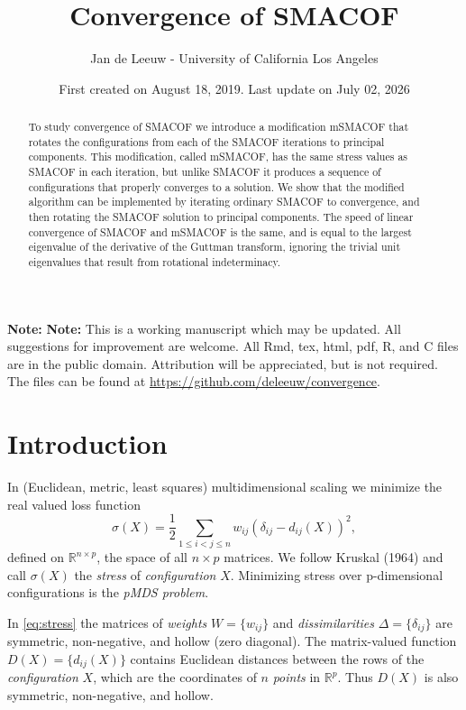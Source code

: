 \documentclass[
  12pt,
]{article}
\title{Convergence of SMACOF}
\author{Jan de Leeuw - University of California Los Angeles}
\date{First created on August 18, 2019. Last update on July 02, 2026}
\begin{document}
\maketitle
\begin{abstract}
To study convergence of SMACOF we introduce a modification mSMACOF that rotates the configurations from each of the SMACOF iterations to principal components. This modification, called mSMACOF, has the same stress values as SMACOF in each iteration, but unlike SMACOF it produces a sequence of configurations that properly converges to a solution. We show that the modified algorithm can be implemented by iterating ordinary SMACOF to convergence, and then rotating the SMACOF solution to principal components. The speed of linear convergence of SMACOF and mSMACOF is the same, and is equal to the largest eigenvalue of the derivative of the Guttman transform, ignoring the trivial unit eigenvalues that result from rotational indeterminacy.
\end{abstract}

{
\setcounter{tocdepth}{3}
\tableofcontents
}
\textbf{Note:} \textbf{Note:} This is a working manuscript which may be updated.
All suggestions for improvement are welcome. All Rmd, tex,
html, pdf, R, and C files are in the public domain. Attribution will be
appreciated, but is not required. The files can be found at
\url{https://github.com/deleeuw/convergence}.

\section{Introduction}\label{introduction}

In (Euclidean, metric, least squares) multidimensional scaling we minimize the real valued loss function
\begin{equation}
\sigma(X)=\frac12\mathop{\sum}_{1\leq i<j\leq n} w_{ij}(\delta_{ij}-d_{ij}(X))^2,
\label{eq:stress}
\end{equation}
defined on \(\mathbb{R}^{n\times p}\), the space of all \(n\times p\) matrices. We follow Kruskal (1964) and call \(\sigma(X)\) the \emph{stress} of \emph{configuration} \(X\). Minimizing stress over p-dimensional configurations is the \emph{pMDS problem}.

In \eqref{eq:stress} the matrices of \emph{weights} \(W=\{w_{ij}\}\) and \emph{dissimilarities} \(\Delta=\{\delta_{ij}\}\) are symmetric, non-negative, and hollow (zero diagonal). The matrix-valued function \(D(X)=\{d_{ij}(X)\}\) contains Euclidean distances between the rows of the \emph{configuration} \(X\), which are the coordinates of \(n\) \emph{points} in \(\mathbb{R}^p\). Thus \(D(X)\) is also symmetric, non-negative, and hollow.
\end{document}
